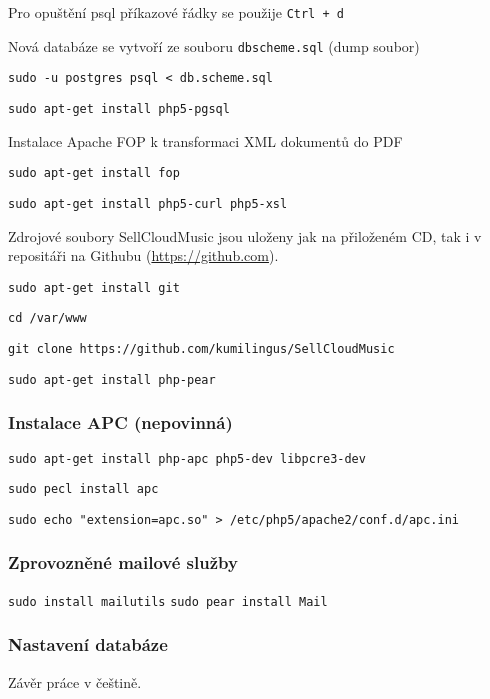 \documentclass[12pt]{article}
\begin{document}
Pro opuštění psql příkazové řádky se použije \texttt{Ctrl + d}\newline

Nová databáze se vytvoří ze souboru \texttt{dbscheme.sql} (dump soubor)\newline

\texttt{sudo -u postgres psql < db.scheme.sql}\newline


\texttt{sudo apt-get install php5-pgsql}


Instalace Apache FOP k transformaci XML dokumentů do PDF

\texttt{sudo apt-get install fop}

\texttt{sudo apt-get install php5-curl php5-xsl}


Zdrojové soubory SellCloudMusic jsou uloženy jak na přiloženém CD, tak i v repositáři na Githubu (\url{https://github.com}).\newline

\texttt{sudo apt-get install git}

\texttt{cd /var/www}

\texttt{git clone https://github.com/kumilingus/SellCloudMusic}


\texttt{sudo apt-get install php-pear}


\subsubsection{Instalace APC (nepovinná)}\label{apc}

\texttt{sudo apt-get install php-apc php5-dev libpcre3-dev}

\texttt{sudo pecl install apc}

\texttt{sudo echo "extension=apc.so" > /etc/php5/apache2/conf.d/apc.ini}

\subsubsection{Zprovozněné mailové služby}

\texttt{sudo install mailutils}
\texttt{sudo pear install Mail}

\subsubsection{Nastavení databáze}


\begin{conclusions-cz}
  Závěr práce v češtině.
\end{conclusions-cz}
\end{document}
